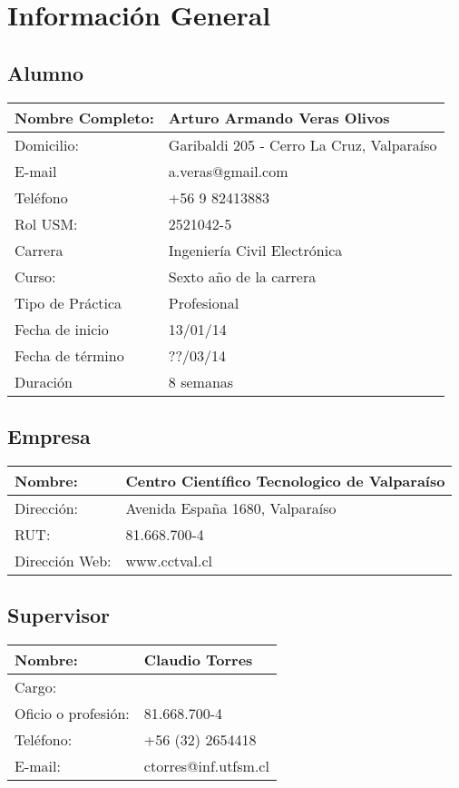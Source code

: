 \documentclass[11pt,twoside]{article}
\begin{document}

\newpage
\section{Información General}

\subsection{Alumno}
\begin{tabular}{|l|l|}
\hline 
Nombre Completo: & Arturo Armando Veras Olivos \\ 
\hline 
Domicilio: & Garibaldi 205 - Cerro La Cruz, Valpara\'iso \\ 
\hline 
E-mail & a.veras@gmail.com \\ 
\hline 
Tel\'efono & +56 9 82413883 \\ 
\hline 
Rol USM: & 2521042-5 \\ 
\hline 
Carrera & Ingenier\'ia Civil Electr\'onica \\ 
\hline 
Curso: & Sexto año de la carrera \\ 
\hline 
Tipo de Pr\'actica & Profesional \\ 
\hline 
Fecha de inicio & 13/01/14 \\ 
\hline 
Fecha de t\'ermino & ??/03/14 \\ 
\hline 
Duraci\'on & 8 semanas \\ 
\hline 
\end{tabular} 
\subsection{Empresa}

\begin{tabular}{|l|l|}
\hline 
Nombre: & Centro Cient\'ifico Tecnologico de Valpara\'iso \\ 
\hline 
Direcci\'on: & Avenida España 1680, Valpara\'iso \\ 
\hline 
RUT:  & 81.668.700-4 \\ 
\hline 
Direcci\'on Web: & www.cctval.cl \\ 
\hline 
\end{tabular} 

\subsection{Supervisor}
\begin{tabular}{|l|l|}
\hline 
Nombre: & Claudio Torres \\ 
\hline 
Cargo: &   \\ 
\hline 
Oficio o profesi\'on:  & 81.668.700-4 \\ 
\hline 
Tel\'efono: & +56 (32) 2654418 \\ 
\hline 
E-mail: & ctorres@inf.utfsm.cl \\ 
\hline
\end{tabular} 
\end{document}
